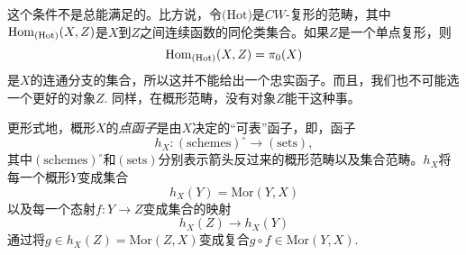 这个条件不是总能满足的。比方说，令$\text{(Hot)}$是$CW$-复形的范畴，其中$\operatorname{Hom}_\text{(Hot)}(X,Z)$是$X$到$Z$之间连续函数的同伦类集合。如果$Z$是一个单点复形，则
\[
	\operatorname{Hom}_\text{(Hot)}(X,Z)=\pi_0(X)
\]
是$X$的连通分支的集合，所以这并不能给出一个忠实函子。而且，我们也不可能选一个更好的对象$Z$. 同样，在概形范畴，没有对象$Z$能干这种事。

更形式地，概形$X$的\textit{点函子}是由$X$决定的“可表”函子，即，函子
\[
	h_X:(\text{schemes})^\circ\to (\text{sets}),
\]
其中$(\text{schemes})^\circ$和$(\text{sets})$分别表示箭头反过来的概形范畴以及集合范畴。$h_X$将每一个概形$Y$变成集合
\[
	h_X(Y)=\mathrm{Mor}(Y,X)
\]
以及每一个态射$f:Y\to Z$变成集合的映射
\[
	h_X(Z)\to h_X(Y)
\]
通过将$g\in h_X(Z)=\mathrm{Mor}(Z,X)$变成复合$g\circ f\in \mathrm{Mor}(Y,X)$.